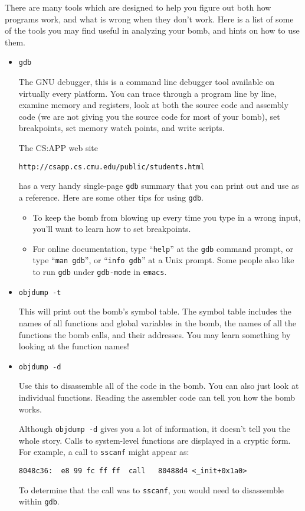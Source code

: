 \documentclass[11pt]{article}
\begin{document}
There are many tools which are designed to help you figure out both
how programs work, and what is wrong when they don't work.  Here is a
list of some of the tools you may find useful in analyzing your bomb,
and hints on how to use them.

\begin{itemize}

\item {\tt gdb }

The GNU debugger, this is a command line debugger tool available on
virtually every platform.  You can trace through a program line by
line, examine memory and registers, look at both the source code and
assembly code (we are not giving you the source code for most of your
bomb), set breakpoints, set memory watch points, and write scripts.

The CS:APP web site 
\begin{verbatim}
http://csapp.cs.cmu.edu/public/students.html
\end{verbatim}
has a very handy single-page {\tt gdb} summary that you can print out
and use as a reference. Here are some other tips for using {\tt gdb}.
\begin{itemize}

\item To keep the bomb from blowing up every time you type in a wrong
input, you'll want to learn how to set breakpoints.

\item For online documentation, type ``{\tt help}'' at the {\tt gdb} 
command prompt, 
or type ``{\tt man gdb}'', or ``{\tt info gdb}'' at a Unix prompt.  
Some people also
like to run {\tt gdb} under {\tt gdb-mode} in {\tt emacs}.
\end{itemize}

\item \texttt{objdump -t}

This will print out the bomb's symbol table. The symbol table includes the
names of all functions and global variables in the bomb, the names of
all the functions the bomb calls, and their addresses.  You may learn
something by looking at the function names!

\item \texttt{objdump -d}

Use this to disassemble all of the code in the bomb.  You can also
just look at individual functions.  Reading the assembler code can
tell you how the bomb works. 

Although {\tt objdump -d} gives you a lot of information, it doesn't tell
you the whole story. Calls to system-level functions are displayed in
a cryptic form. For example, a call to {\tt sscanf} might appear as:
\begin{verbatim}
8048c36:  e8 99 fc ff ff  call   80488d4 <_init+0x1a0> 
\end{verbatim}
To determine that the call was to {\tt sscanf}, you would need to
disassemble within {\tt gdb}.



\end{itemize}
\end{document}

